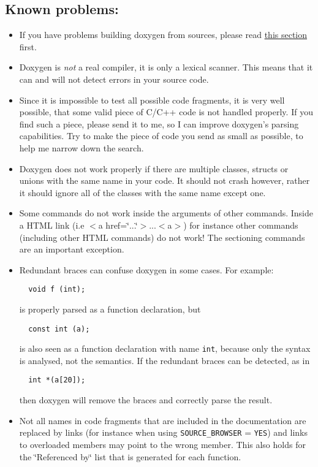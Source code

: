 \subsection*{Known problems:}

\begin{itemize}
\item If you have problems building doxygen from sources, please read \hyperlink{install_unix_problems}{this section} first. \item Doxygen is {\em not\/} a real compiler, it is only a lexical scanner. This means that it can and will not detect errors in your source code. \item Since it is impossible to test all possible code fragments, it is very well possible, that some valid piece of C/C++ code is not handled properly. If you find such a piece, please send it to me, so I can improve doxygen's parsing capabilities. Try to make the piece of code you send as small as possible, to help me narrow down the search. \item Doxygen does not work properly if there are multiple classes, structs or unions with the same name in your code. It should not crash however, rather it should ignore all of the classes with the same name except one. \item Some commands do not work inside the arguments of other commands. Inside a HTML link (i.e $<$a href=\char`\"{}...\char`\"{}$>$...$<$a$>$) for instance other commands (including other HTML commands) do not work! The sectioning commands are an important exception. \item Redundant braces can confuse doxygen in some cases. For example: 

\footnotesize\begin{verbatim}
  void f (int);
\end{verbatim}
\normalsize
 is properly parsed as a function declaration, but 

\footnotesize\begin{verbatim}
  const int (a);
\end{verbatim}
\normalsize
 is also seen as a function declaration with name {\tt int}, because only the syntax is analysed, not the semantics. If the redundant braces can be detected, as in 

\footnotesize\begin{verbatim}
  int *(a[20]);
\end{verbatim}
\normalsize
 then doxygen will remove the braces and correctly parse the result. \item Not all names in code fragments that are included in the documentation are replaced by links (for instance when using {\tt SOURCE\_\-BROWSER} = {\tt YES}) and links to overloaded members may point to the wrong member. This also holds for the \char`\"{}Referenced by\char`\"{} list that is generated for each function.


\end{itemize}
